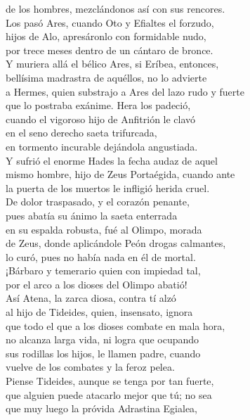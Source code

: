 de los hombres, mezclándonos así con sus rencores.\\
Los pasó Ares, cuando Oto y Efialtes el forzudo,\\
hijos de Alo, apresáronlo con formidable nudo,\\
por trece meses dentro de un cántaro de bronce.\\
Y muriera allá el bélico Ares, si Eríbea, entonces,\\
bellísima madrastra de aquéllos, no lo advierte\\
a Hermes, quien substrajo a Ares del lazo rudo y fuerte\\
que lo postraba exánime. Hera los padeció,\\
cuando el vigoroso hijo de Anfitrión le clavó\\
en el seno derecho saeta trifurcada,\\
en tormento incurable dejándola angustiada.\\
Y sufrió el enorme Hades la fecha audaz de aquel\\
mismo hombre, hijo de Zeus Portaégida, cuando ante\\
la puerta de los muertos le infligió herida cruel.\\
De dolor traspasado, y el corazón penante,\\
pues abatía su ánimo la saeta enterrada\\
en su espalda robusta, fué al Olimpo, morada\\
de Zeus, donde aplicándole Peón drogas calmantes,\\
lo curó, pues no había nada en él de mortal.\\
¡Bárbaro y temerario quien con impiedad tal,\\
por el arco a los dioses del Olimpo abatió!\\
Así Atena, la zarca diosa, contra tí alzó\\
al hijo de Tideides, quien, insensato, ignora\\
que todo el que a los dioses combate en mala hora,\\
no alcanza larga vida, ni logra que ocupando\\
sus rodillas los hijos, le llamen padre, cuando\\
vuelve de los combates y la feroz pelea.\\
Piense Tideides, aunque se tenga por tan fuerte,\\
que alguien puede atacarlo mejor que tú; no sea\\
que muy luego la próvida Adrastina Egialea,\\
